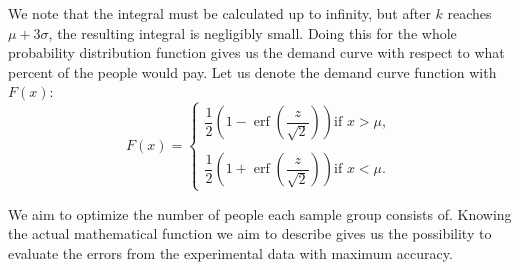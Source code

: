 \documentclass[11pt, a4paper]{article}
\theoremstyle{definition}
\begin{document}
		We note that the integral must be calculated up to infinity, but after $k$ reaches $\mu+3\sigma$, the resulting integral is negligibly small. Doing this for the whole probability distribution function gives us the demand curve with respect to what percent of the people would pay. Let us denote the demand curve function with $F(x)$:
		$$
		F(x)=
		\begin{cases}
			\dfrac{1}{2}\left (1-\operatorname{erf}\left (\dfrac{z}{\sqrt{2}}\right )\right ) \text{if } x>\mu,\\
			\\
			\dfrac{1}{2}\left (1+\operatorname{erf}\left (\dfrac{z}{\sqrt{2}}\right )\right ) \text{if } x<\mu.
		\end{cases}
		$$\par
		We aim to optimize the number of people each sample group consists of. Knowing the actual mathematical function we aim to describe gives us the possibility to evaluate the errors from the experimental data with maximum accuracy.
\end{document}
